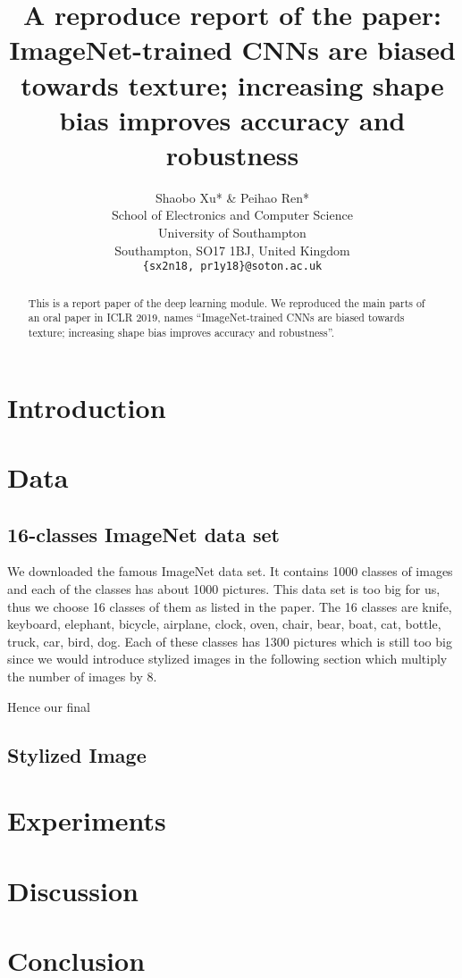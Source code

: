 \documentclass{article} %
\title{A reproduce report of the paper: \\ 
ImageNet-trained CNNs are biased towards texture; increasing shape bias improves accuracy and robustness}
\author{Shaobo Xu* \& Peihao Ren*  \\
School of Electronics and Computer Science\\
University of Southampton\\
Southampton, SO17 1BJ, United Kingdom\\
\texttt{\{sx2n18, pr1y18\}@soton.ac.uk} \\
}
\begin{document}
\maketitle

\begin{abstract}

This is a report paper of the deep learning module. We reproduced the main parts of an oral paper in ICLR 2019, names ``ImageNet-trained CNNs are biased towards texture; increasing shape bias improves accuracy and robustness''.

\end{abstract}

\section{Introduction}


\section{Data}

\subsection{16-classes ImageNet data set}
We downloaded the famous ImageNet data set. It contains 1000 classes of images and each of the classes has about 1000 pictures. This data set is too big for us, thus we choose 16 classes of them as listed in the paper. The 16 classes are knife, keyboard, elephant, bicycle, airplane, clock, oven, chair, bear, boat, cat, bottle, truck, car, bird, dog. Each of these classes has 1300 pictures which is still too big since we would introduce stylized images in the following section which multiply the number of images by 8.

Hence our final 

\subsection{Stylized Image}

\section{Experiments}
\section{Discussion}
\section{Conclusion}
\end{document}
